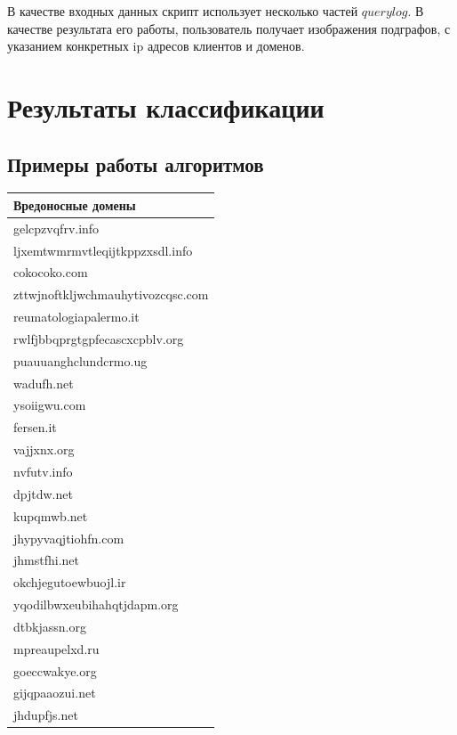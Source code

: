 \documentclass[14pt]{extreport} %
\begin{document}
В качестве входных данных скрипт использует несколько частей $querylog$. В качестве результата его работы, пользователь получает изображения подграфов, с указанием конкретных ip адресов клиентов и доменов.

\chapter{Результаты классификации}
\section{Примеры работы алгоритмов}
\begin{center}
	\begin{tabular}{ | l |}
		\hline                              
		Вредоносные домены \\ \hline
		gelcpzvqfrv.info                    \\ \hline
		ljxemtwmrmvtleqijtkppzxsdl.info     \\ \hline
		cokocoko.com                        \\ \hline
		zttwjnoftkljwchmauhytivozcqsc.com   \\ \hline
		reumatologiapalermo.it              \\ \hline
		rwlfjbbqprgtgpfecascxcpblv.org      \\ \hline
		puauuanghclundcrmo.ug               \\ \hline
		wadufh.net                          \\ \hline
		ysoiigwu.com                        \\ \hline
		fersen.it                           \\ \hline
		vajjxnx.org                         \\ \hline
		nvfutv.info                         \\ \hline
		dpjtdw.net                          \\ \hline
		kupqmwb.net                         \\ \hline
		jhypyvaqjtiohfn.com                 \\ \hline
		jhmstfhi.net                        \\ \hline
		okchjegutoewbuojl.ir                \\ \hline
		yqodilbwxeubihahqtjdapm.org         \\ \hline
		dtbkjassn.org                       \\ \hline
		mpreaupelxd.ru                      \\ \hline
		goeccwakye.org                      \\ \hline
		gijqpaaozui.net                     \\ \hline
		jhdupfjs.net                        \\ \hline
		                                    

\end{tabular}
\end{center}
\end{document}
